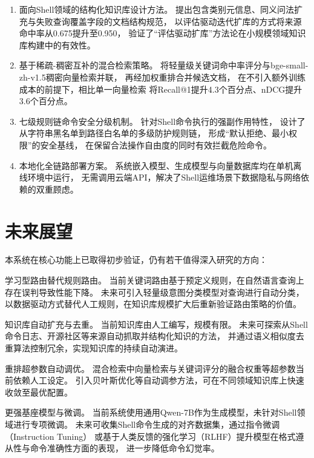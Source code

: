 \begin{enumerate}
    \item 面向Shell领域的结构化知识库设计方法。
    提出包含类别元信息、同义问法扩充与失败查询覆盖字段的文档结构规范，
    以评估驱动迭代扩库的方式将来源命中率从0.675提升至0.950，
    验证了“评估驱动扩库”方法论在小规模领域知识库构建中的有效性。

    \item 基于稀疏-稠密互补的混合检索策略。
    将轻量级关键词命中率评分与bge-small-zh-v1.5稠密向量检索并联，
    再经加权重排合并候选文档，
    在不引入额外训练成本的前提下，相比单一向量检索
    将Recall@1提升4.3个百分点、nDCG提升3.6个百分点。

    \item 七级规则链命令安全分级机制。
    针对Shell命令执行的强副作用特性，
    设计了从字符串黑名单到路径白名单的多级防护规则链，
    形成“默认拒绝、最小权限”的安全基线，
    在保留合法操作自由度的同时有效拦截危险命令。

    \item 本地化全链路部署方案。
    系统嵌入模型、生成模型与向量数据库均在单机离线环境中运行，
    无需调用云端API，解决了Shell运维场景下数据隐私与网络依赖的双重顾虑。
\end{enumerate}

\section{未来展望}

本系统在核心功能上已取得初步验证，仍有若干值得深入研究的方向：

学习型路由替代规则路由。
当前关键词路由基于预定义规则，在自然语言查询上存在误判导致性能下降。
未来可引入轻量级意图分类模型对查询进行自动分类，
以数据驱动方式替代人工规则，在知识库规模扩大后重新验证路由策略的价值。

知识库自动扩充与去重。
当前知识库由人工编写，规模有限。
未来可探索从Shell命令日志、开源社区等来源自动抓取并结构化知识的方法，
并通过语义相似度去重算法控制冗余，实现知识库的持续自动演进。

重排超参数自动调优。
混合检索中向量检索与关键词评分的融合权重等超参数当前依赖人工设定。
引入贝叶斯优化等自动调参方法，可在不同领域知识库上快速收敛至最优配置。

更强基座模型与微调。
当前系统使用通用Qwen-7B作为生成模型，未针对Shell领域进行专项微调。
未来可收集Shell命令生成的对齐数据集，通过指令微调（Instruction Tuning）
或基于人类反馈的强化学习（RLHF）提升模型在格式遵从性与命令准确性方面的表现，
进一步降低命令幻觉率。


